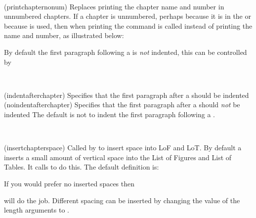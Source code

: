 \begin{syntax}
\cmd{\printchapternonum} \\
\end{syntax}
\glossary(printchapternonum)%
  {}%
  {Replaces printing the chapter name and number in unnumbered chapters.}
If a chapter is unnumbered, perhaps because it is in the \cmd{\frontmatter}
or because \cmd{\chapter*} is used, then when printing the command
\cmd{\printchapternonum} is called instead of printing the name and number,
as illustrated below:
\begin{lcode}
\newcommand{\chapterhead}[1]{ %
  \clearforchapter        %
  \thispagestyle{chapter} %
  \insertchapterspace     %
  \chapterheadstart       %
  \printchaptername\chapternamenum\printchapternum
  \afterchapternum        %
  \printchaptertitle{#1}  %
  \afterchaptertitle}     %
\end{lcode}
%
%
%
By default the first paragraph following a  is \emph{not}
indented, this can be controlled by
\begin{syntax}
  \cmd{\indentafterchapter}\\
  \cmd{\noindentafterchapter}
\end{syntax}
\glossary(indentafterchapter)%
{}%
{Specifies that the first paragraph after a  should be indented}
\glossary(noindentafterchapter)%
{}%
{Specifies that the first paragraph after a  should \emph{not} be indented}
The default is not to indent the first paragraph following a
.

\begin{syntax}
\cmd{\insertchapterspace} \\
\end{syntax}
\glossary(insertchapterspace)%
  {}%
  {Called by  to insert space into LoF and LoT.}
By default a \cmd{\chapter} inserts a small amount of vertical space
into the List of Figures and List of Tables. It calls \cmd{\insertchapterspace}
to do this. The default definition is:
\begin{lcode}
\newcommand{\insertchapterspace}{%
  \addtocontents{lof}{\protect\addvspace{10pt}}%
  \addtocontents{lot}{\protect\addvspace{10pt}}%
}
\end{lcode}
If you would prefer no inserted spaces then 
\begin{lcode}
\renewcommand{\insertchapterspace}{}
\end{lcode}
will do the job. 
Different spacing can be inserted by
changing the value of the length arguments to \cmd{\addvspace}.

